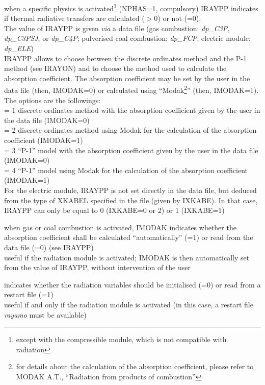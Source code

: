 {when a specific physics is activated\footnote{except with the compressible
module, which is not compatible with radiation}
(NPHAS=1, compulsory) IRAYPP
indicates if thermal radiative transfers are calculated ($>0$) or not
(=0).\\
The value of IRAYPP is given {\em via} a data file (gas combustion:
{\em dp\_C3P}, {\em dp\_C3PSJ}, or {\em dp\_C4P};
pulverised coal combustion: {\em dp\_FCP}; electric module: {\em dp\_ELE})\\
IRAYPP allows to choose between the discrete ordinates method and the
P-1 method (see IRAYON) and to choose the method used to calculate the
absorption coefficient. The absorption coefficient may be set by the
user in the data file (then, \mbox{IMODAK=0}) or calculated using
``Modak\footnote{for details about the calculation of the absorption
coefficient, please refer to MODAK A.T., ``Radiation from products
of combustion''}'' (then, IMODAK=1).
The options are the followings:\\
\hspace*{1.3cm} = 1 discrete ordinates method with the absorption coefficient
given by the user in the data file (IMODAK=0)\\
\hspace*{1.3cm} = 2 discrete ordinates method using Modak for the
calculation of the absorption coefficient (IMODAK=1)\\
\hspace*{1.3cm} = 3 ``P-1'' model  with the absorption coefficient
given by the user in the data file (IMODAK=0)\\
\hspace*{1.3cm} = 4 ``P-1'' model using Modak for the
calculation of the absorption coefficient (IMODAK=1)\\
For the electric module, IRAYPP is not set directly in the data file, but
deduced from the type of XKABEL specified in the file (given by IXKABE).
In that case, IRAYPP can only be equal to 0 (IXKABE=0 or 2) or 1 (IXKABE=1)}

{when gas or coal combustion is activated, IMODAK indicates whether the
absorption coefficient shall be calculated ``automatically'' (=1) or read from
the data file (=0) (see IRAYPP)\\
useful if the radiation module is activated; IMODAK is then automatically set
from the value of IRAYPP, without intervention of the user}

{indicates whether the radiation variables should be initialised (=0) or read
from a restart file (=1)\\
useful if and only if the radiation module is activated (in this case, a
restart file {\em rayamo} must be available)}

